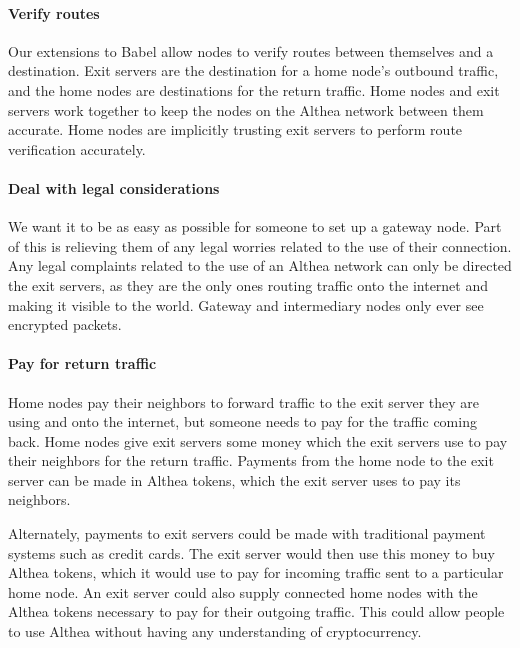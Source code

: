\documentclass[11pt]{article}
\begin{document}
\paragraph{Verify routes}
Our extensions to Babel allow nodes to verify routes between themselves and a destination. Exit servers are the destination for a home node’s outbound traffic, and the home nodes are destinations for the return traffic. Home nodes and exit servers work together to keep the nodes on the Althea network between them accurate. Home nodes are implicitly trusting exit servers to perform route verification accurately.

\paragraph{Deal with legal considerations}
We want it to be as easy as possible for someone to set up a gateway node. Part of this is relieving them of any legal worries related to the use of their connection. Any legal complaints related to the use of an Althea network can only be directed the exit servers, as they are the only ones routing traffic onto the internet and making it visible to the world. Gateway and intermediary nodes only ever see encrypted packets.

\paragraph{Pay for return traffic}
Home nodes pay their neighbors to forward traffic to the exit server they are using and onto the internet, but someone needs to pay for the traffic coming back. Home nodes give exit servers some money which the exit servers use to pay their neighbors for the return traffic. Payments from the home node to the exit server can be made in Althea tokens, which the exit server uses to pay its neighbors.

Alternately, payments to exit servers could be made with traditional payment systems such as credit cards. The exit server would then use this money to buy Althea tokens, which it would use to pay for incoming traffic sent to a particular home node. An exit server could also supply connected home nodes with the Althea tokens necessary to pay for their outgoing traffic. This could allow people to use Althea without having any understanding of cryptocurrency.
\end{document}
